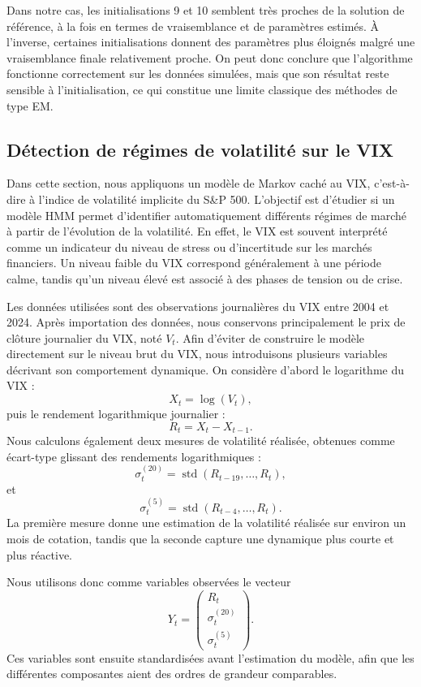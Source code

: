 \documentclass[11pt]{article}
\begin{document}
Dans notre cas, les initialisations 9 et 10 semblent très proches de la solution de référence, à la fois en termes de vraisemblance et de paramètres estimés. À l'inverse, certaines initialisations donnent des paramètres plus éloignés malgré une vraisemblance finale relativement proche. On peut donc conclure que l'algorithme fonctionne correctement sur les données simulées, mais que son résultat reste sensible à l'initialisation, ce qui constitue une limite classique des méthodes de type EM.



\subsection{Détection de régimes de volatilité sur le VIX}


Dans cette section, nous appliquons un modèle de Markov caché au VIX, c'est-à-dire à l'indice de volatilité implicite du S\&P 500. L'objectif est d'étudier si un modèle HMM permet d'identifier automatiquement différents régimes de marché à partir de l'évolution de la volatilité. En effet, le VIX est souvent interprété comme un indicateur du niveau de stress ou d'incertitude sur les marchés financiers. Un niveau faible du VIX correspond généralement à une période calme, tandis qu'un niveau élevé est associé à des phases de tension ou de crise.

Les données utilisées sont des observations journalières du VIX entre 2004 et 2024. Après importation des données, nous conservons principalement le prix de clôture journalier du VIX, noté $V_t$. Afin d'éviter de construire le modèle directement sur le niveau brut du VIX, nous introduisons plusieurs variables décrivant son comportement dynamique. On considère d'abord le logarithme du VIX :
\[
    X_t = \log(V_t),
\]
puis le rendement logarithmique journalier :
\[
    R_t = X_t - X_{t-1}.
\]
Nous calculons également deux mesures de volatilité réalisée, obtenues comme écart-type glissant des rendements logarithmiques :
\[
    \sigma^{(20)}_t = \operatorname{std}(R_{t-19},\dots,R_t),
\]
et
\[
    \sigma^{(5)}_t = \operatorname{std}(R_{t-4},\dots,R_t).
\]
La première mesure donne une estimation de la volatilité réalisée sur environ un mois de cotation, tandis que la seconde capture une dynamique plus courte et plus réactive.

Nous utilisons donc comme variables observées le vecteur
\[
    Y_t =
    \begin{pmatrix}
        R_t \\
        \sigma^{(20)}_t \\
        \sigma^{(5)}_t
    \end{pmatrix}.
\]
Ces variables sont ensuite standardisées avant l'estimation du modèle, afin que les différentes composantes aient des ordres de grandeur comparables.
\end{document}
